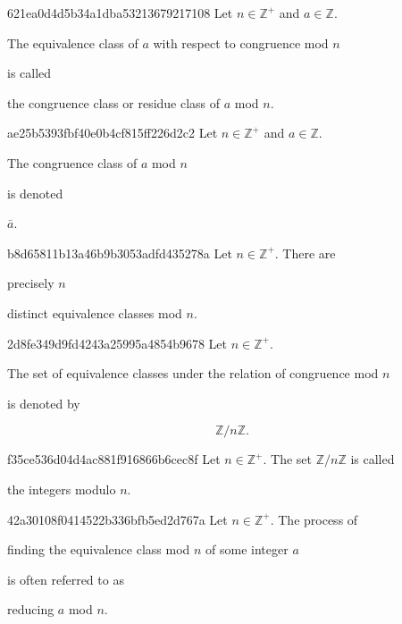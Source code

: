 \begin{note}{621ea0d4d5b34a1dba53213679217108}
    Let \({ n \in \mathbb Z^{+} }\) and \({ a \in \mathbb Z }\).
    \begin{icloze}{1}The equivalence class of \({ a }\) with respect to congruence mod \({ n }\)\end{icloze} is called \begin{icloze}{2}the congruence class or residue class of \({ a }\) mod \({ n }\).\end{icloze}
\end{note}

\begin{note}{ae25b5393fbf40e0b4cf815ff226d2c2}
    Let \({ n \in \mathbb Z^{+} }\) and \({ a \in \mathbb Z }\).
    \begin{icloze}{2}The congruence class of \({ a }\) mod \({ n }\)\end{icloze} is denoted \begin{icloze}{1}\({ \bar a }\).\end{icloze}
\end{note}

\begin{note}{b8d65811b13a46b9b3053adfd435278a}
    Let \({ n \in \mathbb Z^{+} }\).
    There are \begin{icloze}{1}precisely \({ n }\)\end{icloze} distinct equivalence classes mod \({ n }\).
\end{note}

\begin{note}{2d8fe349d9fd4243a25995a4854b9678}
    Let \({ n \in \mathbb Z^{+} }\).
    \begin{icloze}{1}The set of equivalence classes under the relation of congruence mod \({ n }\)\end{icloze} is denoted by
    \begin{icloze}{2}
        \[
            \mathbb Z / n\mathbb Z.
        \]
    \end{icloze}
\end{note}

\begin{note}{f35ce536d04d4ac881f916866b6cec8f}
    Let \({ n \in \mathbb Z^{+} }\).
    The set \({ \mathbb Z / n\mathbb Z }\) is called \begin{icloze}{1}the integers modulo \({ n }\).\end{icloze}
\end{note}

\begin{note}{42a30108f0414522b336bfb5ed2d767a}
    Let \({ n \in \mathbb Z^{+} }\).
    The process of \begin{icloze}{2}finding the equivalence class mod \({ n }\) of some integer \({ a }\)\end{icloze} is often referred to as \begin{icloze}{1}reducing \({ a }\) mod \({ n }\).\end{icloze}
\end{note}

